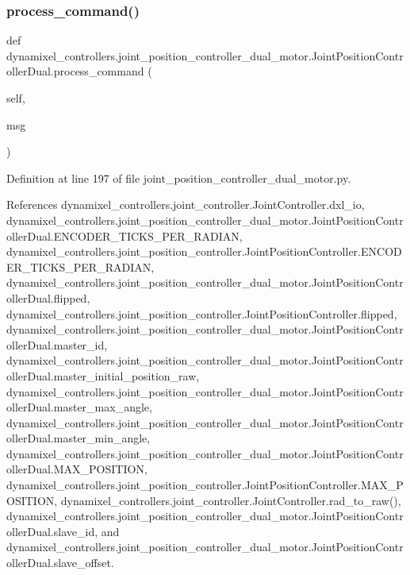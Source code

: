 \subsubsection{\texorpdfstring{process\+\_\+command()}{process\_command()}}
{\footnotesize\ttfamily def dynamixel\+\_\+controllers.\+joint\+\_\+position\+\_\+controller\+\_\+dual\+\_\+motor.\+Joint\+Position\+Controller\+Dual.\+process\+\_\+command (\begin{DoxyParamCaption}\item[{}]{self,  }\item[{}]{msg }\end{DoxyParamCaption})}



Definition at line 197 of file joint\+\_\+position\+\_\+controller\+\_\+dual\+\_\+motor.\+py.



References dynamixel\+\_\+controllers.\+joint\+\_\+controller.\+Joint\+Controller.\+dxl\+\_\+io, dynamixel\+\_\+controllers.\+joint\+\_\+position\+\_\+controller\+\_\+dual\+\_\+motor.\+Joint\+Position\+Controller\+Dual.\+E\+N\+C\+O\+D\+E\+R\+\_\+\+T\+I\+C\+K\+S\+\_\+\+P\+E\+R\+\_\+\+R\+A\+D\+I\+AN, dynamixel\+\_\+controllers.\+joint\+\_\+position\+\_\+controller.\+Joint\+Position\+Controller.\+E\+N\+C\+O\+D\+E\+R\+\_\+\+T\+I\+C\+K\+S\+\_\+\+P\+E\+R\+\_\+\+R\+A\+D\+I\+AN, dynamixel\+\_\+controllers.\+joint\+\_\+position\+\_\+controller\+\_\+dual\+\_\+motor.\+Joint\+Position\+Controller\+Dual.\+flipped, dynamixel\+\_\+controllers.\+joint\+\_\+position\+\_\+controller.\+Joint\+Position\+Controller.\+flipped, dynamixel\+\_\+controllers.\+joint\+\_\+position\+\_\+controller\+\_\+dual\+\_\+motor.\+Joint\+Position\+Controller\+Dual.\+master\+\_\+id, dynamixel\+\_\+controllers.\+joint\+\_\+position\+\_\+controller\+\_\+dual\+\_\+motor.\+Joint\+Position\+Controller\+Dual.\+master\+\_\+initial\+\_\+position\+\_\+raw, dynamixel\+\_\+controllers.\+joint\+\_\+position\+\_\+controller\+\_\+dual\+\_\+motor.\+Joint\+Position\+Controller\+Dual.\+master\+\_\+max\+\_\+angle, dynamixel\+\_\+controllers.\+joint\+\_\+position\+\_\+controller\+\_\+dual\+\_\+motor.\+Joint\+Position\+Controller\+Dual.\+master\+\_\+min\+\_\+angle, dynamixel\+\_\+controllers.\+joint\+\_\+position\+\_\+controller\+\_\+dual\+\_\+motor.\+Joint\+Position\+Controller\+Dual.\+M\+A\+X\+\_\+\+P\+O\+S\+I\+T\+I\+ON, dynamixel\+\_\+controllers.\+joint\+\_\+position\+\_\+controller.\+Joint\+Position\+Controller.\+M\+A\+X\+\_\+\+P\+O\+S\+I\+T\+I\+ON, dynamixel\+\_\+controllers.\+joint\+\_\+controller.\+Joint\+Controller.\+rad\+\_\+to\+\_\+raw(), dynamixel\+\_\+controllers.\+joint\+\_\+position\+\_\+controller\+\_\+dual\+\_\+motor.\+Joint\+Position\+Controller\+Dual.\+slave\+\_\+id, and dynamixel\+\_\+controllers.\+joint\+\_\+position\+\_\+controller\+\_\+dual\+\_\+motor.\+Joint\+Position\+Controller\+Dual.\+slave\+\_\+offset.


